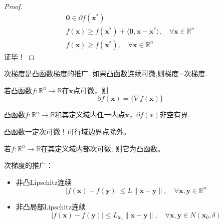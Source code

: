 \begin{proof}
    \[
        \begin{array}{l}
            \mathbf{0}\in\partial f(\boldsymbol{x}^*)\\
            f(\boldsymbol{x})\geqslant f(\boldsymbol{x}^*)+\langle\boldsymbol{0},\boldsymbol{x}-\boldsymbol{x}^*\rangle,\quad\forall\boldsymbol{x}\in\mathbb{R}^n\\
            f(\boldsymbol{x})\geqslant f(\boldsymbol{x}^*),\quad\forall\boldsymbol{x}\in\mathbb{R}^n
        \end{array}
    \]
    证毕！
\end{proof}
\begin{note}
    次梯度是凸函数梯度的推广. 如果凸函数连续可微,则\colorbox{cyan!50}{梯度=次梯度}.
\end{note}
\begin{theorem}
    若凸函数$f:\mathbb{R}^n\to\mathbb{R}$在$\boldsymbol{x}$点可微，则
    \[
        \partial f(\boldsymbol{x})=\{\nabla f(\boldsymbol{x})\}
    \]
\end{theorem}
\begin{theorem}
    凸函数$f:\mathbb{R}^n\to\mathbb{R}$和其定义域内任一内点$\boldsymbol{x}$，$\partial f(x)$非空有界.
\end{theorem}
\begin{note}
    \colorbox{cyan!50}{凸函数一定次可微！可行域边界点除外。}
\end{note}
\begin{theorem}
    若$f:\mathbb{R}^n\to\mathbb{R}$在其定义域内部次可微, 则它为凸函数。
\end{theorem}
\begin{note}
    次梯度的推广：
    \begin{itemize}
        \item 非凸Lipschitz连续
        \[
            |f(\boldsymbol{x})-f(\boldsymbol{y})|\leqslant L\|\boldsymbol{x}-\boldsymbol{y}\|,\quad\forall\boldsymbol{x},\boldsymbol{y}\in\mathbb{R}^n
        \]
        \item 非凸局部Lipschitz连续
        \[
            |f(\boldsymbol{x})-f(\boldsymbol{y})|\leqslant L_{\boldsymbol{x}_0}\|\boldsymbol{x}-\boldsymbol{y}\|,\quad\forall\boldsymbol{x},\boldsymbol{y}\in N(\boldsymbol{x}_0,\delta)
        \]
    \end{itemize}
\end{note}
